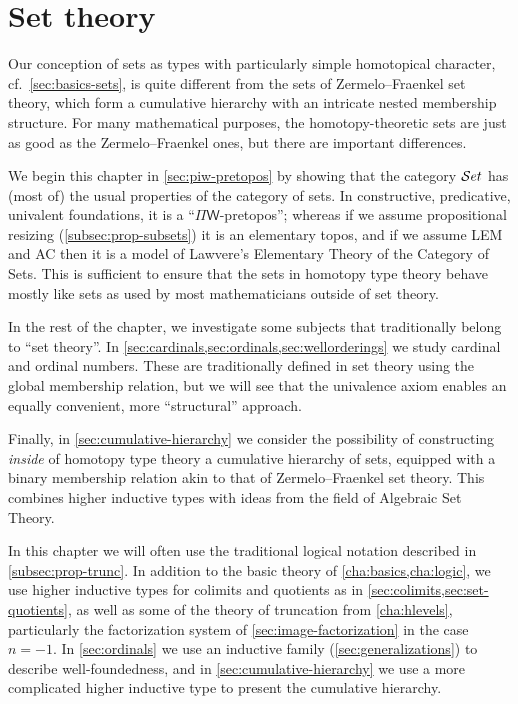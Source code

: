 \chapter{Set theory}
\label{cha:set-math}

Our conception of sets as types with particularly simple homotopical character, cf.\
\autoref{sec:basics-sets}, is quite different from the sets of Zermelo--Fraenkel set theory, which form a
cumulative hierarchy with an intricate nested membership structure.
For many mathematical purposes, the homotopy-theoretic sets are just as good as
the Zermelo--Fraenkel ones, but there are important differences.

We begin this chapter in \autoref{sec:piw-pretopos} by showing that the category $\mathcal{S}et$ has (most of) the usual properties of the category of sets.
In constructive, predicative, univalent foundations, it is a ``$\Pi\mathsf{W}$-pretopos''; whereas if we assume propositional resizing (\autoref{subsec:prop-subsets}) it is an elementary topos, and if we assume LEM and AC then it is a model of Lawvere's Elementary Theory of the Category of Sets.
This is sufficient to ensure that the sets in homotopy type theory behave mostly like sets as used by most mathematicians outside of set theory.

In the rest of the chapter, we investigate some subjects that traditionally belong to ``set theory''.
In \autoref{sec:cardinals,sec:ordinals,sec:wellorderings} we study cardinal and ordinal numbers.
These are traditionally defined in set theory using the global membership relation, but we will see that the univalence axiom enables an equally convenient, more ``structural'' approach.

Finally, in \autoref{sec:cumulative-hierarchy} we consider the possibility of constructing \emph{inside} of homotopy type theory a cumulative hierarchy of sets, equipped with a binary membership relation akin to that of Zermelo--Fraenkel set theory.
This combines higher inductive types with ideas from the field of Algebraic Set Theory.

In this chapter we will often use the traditional logical notation described in \autoref{subsec:prop-trunc}.
In addition to the basic theory of \autoref{cha:basics,cha:logic}, we use higher inductive types for colimits and quotients as in \autoref{sec:colimits,sec:set-quotients}, as well as some of the theory of truncation from \autoref{cha:hlevels}, particularly the factorization system of \autoref{sec:image-factorization} in the case $n=-1$.
In \autoref{sec:ordinals} we use an inductive family (\autoref{sec:generalizations}) to describe well-foundedness, and in \autoref{sec:cumulative-hierarchy} we use a more complicated higher inductive type to present the cumulative hierarchy.


